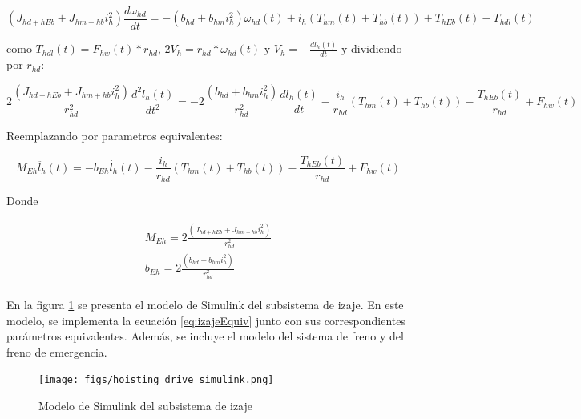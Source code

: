 \documentclass{article}
\begin{document}
            \begin{equation} \label{eq:izajeThdl}
                (J_{hd+hEb} + J_{hm+hb} i_h^2) \frac{d \omega_{hd}}{dt} = - (b_{hd} + b_{hm}i_h^2) \omega_{hd}(t) + i_h (T_{hm}(t) + T_{hb}(t)) + T_{hEb}(t) - T_{hdl}(t)
            \end{equation}

            como $T_{hdl}(t) = F_{hw}(t)*r_{hd}$, $2V_h = r_{hd}*\omega_{hd}(t)$ y $V_h = -\frac{dl_h(t)}{dt}$ y dividiendo por $r_{hd}$:

            \begin{equation} \label{eq:izajeFhw}
                2\frac{(J_{hd+hEb} + J_{hm+hb} i_h^2)}{r_{hd}^2} \frac{d^2 l_h(t)}{dt^2} = - 2\frac{(b_{hd} + b_{hm}i_h^2)}{r_{hd}^2} \frac{d l_h(t)}{dt} - \frac{i_h}{r_{hd}} (T_{hm}(t) + T_{hb}(t)) - \frac{T_{hEb}(t)}{r_{hd}} + F_{hw}(t)
            \end{equation}
            
            Reemplazando por parametros equivalentes:
            
            \begin{equation} \label{eq:izajeEquiv}
                M_{Eh} \ddot{l_h}(t) = - b_{Eh} \dot{l_h}(t) - \frac{i_h}{r_{hd}} (T_{hm}(t) + T_{hb}(t)) - \frac{T_{hEb}(t)}{r_{hd}} + F_{hw}(t)
            \end{equation}

            Donde

            \begin{align} \label{eq:izajeParamsEquiv}
                M_{Eh} = 2\frac{(J_{hd+hEb} + J_{hm+hb} i_h^2)}{r_{hd}^2}\\
                b_{Eh} = 2\frac{(b_{hd} + b_{hm}i_h^2)}{r_{hd}^2}\\
            \end{align}

            En la figura \ref{fig:hoisting_drive_simulink} se presenta el modelo de Simulink del subsistema de izaje. En este modelo, se implementa la ecuación \ref{eq:izajeEquiv} junto con sus correspondientes parámetros equivalentes. Además, se incluye el modelo del sistema de freno y del freno de emergencia. 

            \begin{figure} [H]
                \centering
                \texttt{[image: figs/hoisting\_drive\_simulink.png]}
                \caption{Modelo de Simulink del subsistema de izaje}
                \label{fig:hoisting_drive_simulink}
            \end{figure}
\end{document}
